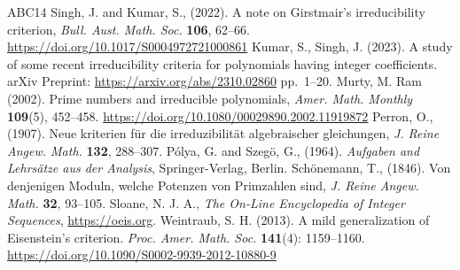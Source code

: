 \documentclass[12pt,reqno]{amsart}%
\begin{document}
\begin{thebibliography}{ABC14}
 Singh, J. and  Kumar, S., (2022). {{A note on Girstmair's irreducibility criterion}}, \emph{Bull. Aust. Math. Soc.} {\textbf{106}}, 62--66. \url{https://doi.org/10.1017/S0004972721000861}
 Kumar, S., Singh, J. (2023). A study of some recent irreducibility criteria for polynomials having integer coefficients. arXiv Preprint: \url{https://arxiv.org/abs/2310.02860} pp.~1--20.
 Murty, M. Ram (2002). Prime numbers and irreducible polynomials, \emph{Amer. Math. Monthly}  {\bf{109}}(5), 452--458. \url{https://doi.org/10.1080/00029890.2002.11919872}
 Perron, O., (1907). Neue kriterien f\"ur die irreduzibilit\"at algebraischer  gleichungen, \emph{J. Reine Angew. Math.} \textbf{132}, 288--307.
 P\'olya, G. and  Szeg\"o, G., (1964). \emph{Aufgaben and Lehrs\"atze aus der Analysis}, Springer-Verlag, Berlin.
 Sch\"{o}nemann, T., (1846). {{Von denjenigen Moduln, welche Potenzen von Primzahlen sind}}, \emph{J. Reine Angew. Math.} {\textbf{32}}, 93--105.
Sloane, N. J. A.,  \emph{The On-Line Encyclopedia of Integer Sequences}, \url{https://oeis.org}.
  Weintraub, S. H. (2013). A mild generalization of Eisenstein's criterion. \emph{Proc. Amer. Math. Soc.} {\bf{141}}(4):  1159--1160. \url{https://doi.org/10.1090/S0002-9939-2012-10880-9}
\end{thebibliography}
\end{document}
